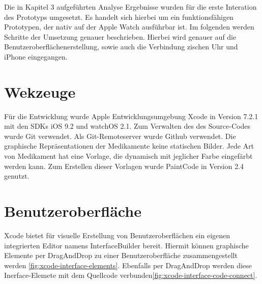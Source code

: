 
Die in Kapitel 3 aufgeführten Analyse Ergebnisse wurden für die erste Interation des Prototyps umgesetzt. Es handelt sich hierbei um ein funktionsfähigen Prototypen, der nativ auf der Apple Watch ausführbar ist. Im folgenden werden Schritte der Umsetzung genauer beschrieben. Hierbei wird genauer auf die Benutzeroberflächenerstellung, sowie auch die Verbindung zischen Uhr und iPhone eingegangen.

\section{Wekzeuge}
Für die Entwicklung wurde Apple Entwicklungsumgebung Xcode in Version 7.2.1 mit den SDKs iOS 9.2 und watchOS 2.1. Zum Verwalten des des Source-Codes wurde Git\cite{git} verwendet. Als Git-Remoteserver wurde Github \cite{github} verwendet. Die graphische Repräsentationen der Medikamente keine statischen Bilder. Jede Art von Medikament hat eine Vorlage, die dynamisch mit jeglicher Farbe eingefärbt werden kann. Zum Erstellen dieser Vorlagen wurde PaintCode in Version 2.4 \cite{paintCode} genutzt.

\section{Benutzeroberfläche}
Xcode bietet für visuelle Erstellung von Benutzeroberflächen ein eigenen integrierten Editor namens InterfaceBuilder bereit. Hiermit können graphische Elemente per DragAndDrop zu einer Benutzeroberfläche zusammengestellt werden \ref{fig:xcode-interface-elements}. Ebenfalls per DragAndDrop werden diese Inerface-Elemete mit dem Quellcode verbunden\ref{fig:xcode-interface-code-connect}.

